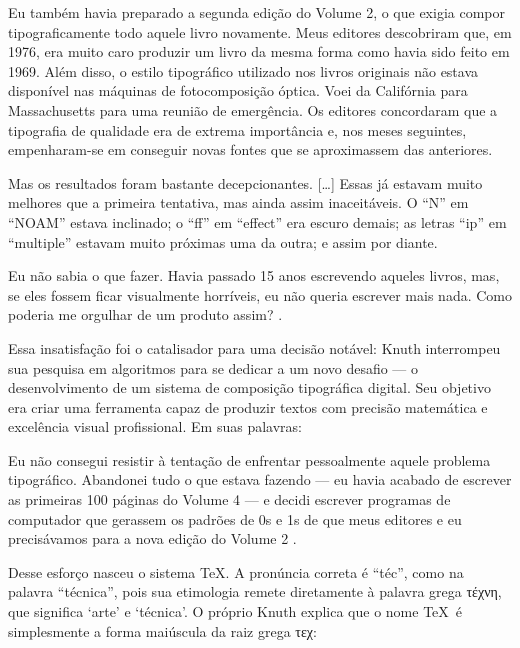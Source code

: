 \begin{citacao}
    Eu também havia preparado a segunda edição do Volume 2, o que exigia compor tipograficamente todo aquele livro novamente. Meus editores descobriram que, em 1976, era muito caro produzir um livro da mesma forma como havia sido feito em 1969. Além disso, o estilo tipográfico utilizado nos livros originais não estava disponível nas máquinas de fotocomposição óptica. Voei da Califórnia para Massachusetts para uma reunião de emergência. Os editores concordaram que a tipografia de qualidade era de extrema importância e, nos meses seguintes, empenharam-se em conseguir novas fontes que se aproximassem das anteriores.

    Mas os resultados foram bastante decepcionantes. [\ldots] Essas já estavam muito melhores que a primeira tentativa, mas ainda assim inaceitáveis. O ``N'' em ``NOAM'' estava inclinado; o ``ff'' em ``effect'' era escuro demais; as letras ``ip'' em ``multiple'' estavam muito próximas uma da outra; e assim por diante.

    Eu não sabia o que fazer. Havia passado 15 anos escrevendo aqueles livros, mas, se eles fossem ficar visualmente horríveis, eu não queria escrever mais nada. Como poderia me orgulhar de um produto assim?
    \cite[tradução própria]{Knuth1996Kyoto}.
\end{citacao}

Essa insatisfação foi o catalisador para uma decisão notável: Knuth interrompeu sua pesquisa em algoritmos para se dedicar a um novo desafio --- o desenvolvimento de um sistema de composição tipográfica digital. Seu objetivo era criar uma ferramenta capaz de produzir textos com precisão matemática e excelência visual profissional. Em suas palavras:

\begin{citacao}
    Eu não consegui resistir à tentação de enfrentar pessoalmente aquele problema tipográfico. Abandonei tudo o que estava fazendo --- eu havia acabado de escrever as primeiras 100 páginas do Volume 4 --- e decidi escrever programas de computador que gerassem os padrões de 0s e 1s de que meus editores e eu precisávamos para a nova edição do Volume 2
    \cite[tradução própria]{Knuth1996Kyoto}.
\end{citacao}

Desse esforço nasceu o sistema \TeX. A pronúncia correta é ``téc'', como na palavra ``técnica'', pois sua etimologia remete diretamente à palavra grega \textgreek{τέχνη}, que significa `arte' e `técnica'. O próprio Knuth explica que o nome \TeX\ é simplesmente a forma maiúscula da raiz grega \textgreek{τεχ}:

